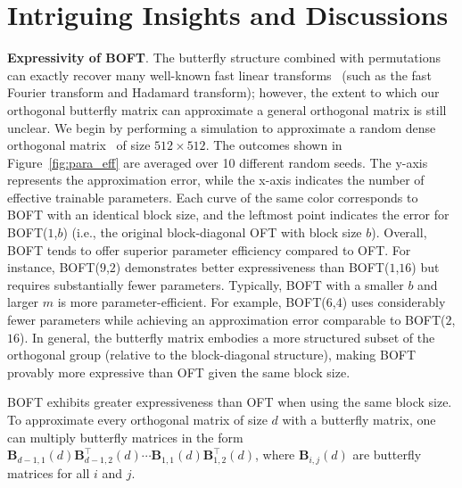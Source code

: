 \section{Intriguing Insights and Discussions}

\textbf{Expressivity of BOFT}. The butterfly structure combined with permutations can exactly recover many well-known fast linear transforms~\cite{dao2019learning,dao2019kaleidoscope} (such as the fast Fourier transform and Hadamard transform); however, the extent to which our orthogonal butterfly matrix can approximate a general orthogonal matrix is still unclear. We begin by performing a simulation to approximate a random dense orthogonal matrix~\cite{anderson1987generation} of size $512\times 512$. The outcomes shown in Figure~\ref{fig:para_eff} are averaged over 10 different random seeds. The y-axis represents the approximation error, while the x-axis indicates the number of effective trainable parameters. Each curve of the same color corresponds to BOFT with an identical block size, and the leftmost point indicates the error for BOFT($1$,$b$) (i.e., the original block-diagonal OFT with block size $b$). Overall, BOFT tends to offer superior parameter efficiency compared to OFT. For instance, BOFT($9$,$2$) demonstrates better expressiveness than BOFT($1$,$16$) but requires substantially fewer parameters. Typically, BOFT with a smaller $b$ and larger $m$ is more parameter-efficient. For example, BOFT($6$,$4$) uses considerably fewer parameters while achieving an approximation error comparable to BOFT($2$,$16$). In general, the butterfly matrix embodies a more structured subset of the orthogonal group (relative to the block-diagonal structure), making BOFT provably more expressive than OFT given the same block size.

\begin{theorem}\label{thm:exp_boft}
    BOFT exhibits greater expressiveness than OFT when using the same block size. To approximate every orthogonal matrix of size $d$ with a butterfly matrix, one can multiply butterfly matrices in the form $\bm{B}_{d-1,1}(d)\bm{B}^\top_{d-1,2}(d)\cdots\bm{B}_{1,1}(d)\bm{B}^\top_{1,2}(d)$, where $\bm{B}_{i,j}(d)$ are butterfly matrices for all $i$ and $j$.
\end{theorem}

